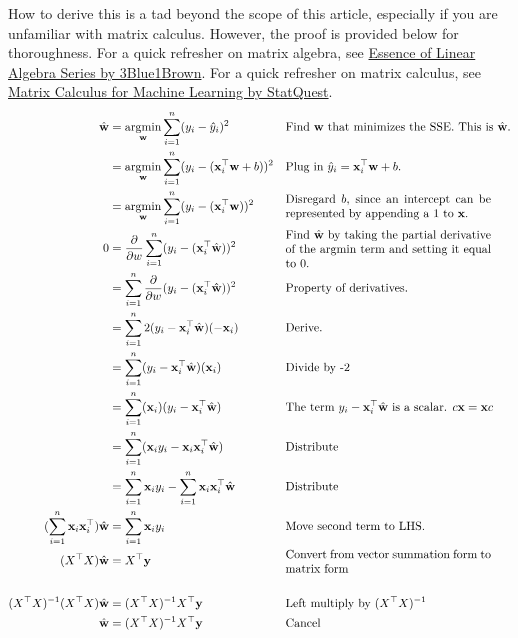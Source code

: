     How to derive this is a tad beyond the scope of this article, especially if you are unfamiliar with matrix calculus. However, the proof is provided below for thoroughness. For a quick refresher on matrix algebra, see \href{https://www.youtube.com/playlist?list=PLZHQObOWTQDNU6R1_67000Dx_ZCJB-3pi}{Essence of Linear Algebra Series by 3Blue1Brown}. For a quick refresher on matrix calculus, see \href{https://www.youtube.com/watch?v=tIkzL4jlt8g}{Matrix Calculus for Machine Learning by StatQuest}.
    \begin{align*}
      \hat{\textbf{w}} &= \argmin_{\mathbf{w}} \sum_{i=1}^n (y_i - \hat{y}_i)^2 && \text{Find $\textbf{w}$ that minimizes the SSE. This is $\hat{\textbf{w}}$.}\\
                       &= \argmin_\mathbf{w} \sum_{i=1}^n (y_i - (\textbf{x}_i^{\top}\textbf{w} + b))^2 && \text{Plug in $\hat{y}_i = \textbf{x}_i^{\top}\textbf{w} + b$.}\\
                       &= \argmin_\mathbf{w} \sum_{i=1}^n (y_i - (\textbf{x}_i^{\top}\textbf{w}))^2 && \text{\parbox{0.5\textwidth}{Disregard $b$, since an intercept can be represented by appending a 1 to $\textbf{x}$.}}\\
        0 &= \frac{\partial}{\partial w} \sum_{i=1}^n (y_i - (\textbf{x}_i^{\top}\hat{\textbf{w}}))^2 && \text{\parbox{0.5\textwidth}{Find $\hat{\textbf{w}}$ by taking the partial derivative of the argmin term and setting it equal to 0.}}\\
          &= \sum_{i=1}^n \frac{\partial}{\partial w} (y_i - (\textbf{x}_i^{\top}\hat{\textbf{w}}))^2 && \text{Property of derivatives.}\\
          &= \sum_{i=1}^n 2(y_i - \textbf{x}_i^{\top}\hat{\textbf{w}})(-\textbf{x}_i) && \text{Derive.}\\
          &= \sum_{i=1}^n (y_i - \textbf{x}_i^{\top}\hat{\textbf{w}})(\textbf{x}_i) && \text{Divide by -2}\\
          &= \sum_{i=1}^n (\textbf{x}_i)(y_i - \textbf{x}_i^{\top}\hat{\textbf{w}}) && \text{The term $y_i - \textbf{x}_i^{\top}\hat{\textbf{w}}$ is a scalar. $c\textbf{x} = \textbf{x}c$}\\
          &= \sum_{i=1}^n (\textbf{x}_iy_i - \textbf{x}_i\textbf{x}_i^{\top}\hat{\textbf{w}}) && \text{Distribute}\\
          &= \sum_{i=1}^n \textbf{x}_iy_i - \sum_{i=1}^n \textbf{x}_i\textbf{x}_i^{\top}\hat{\textbf{w}} && \text{Distribute}\\
        (\sum_{i=1}^n \textbf{x}_i\textbf{x}_i^{\top})\hat{\textbf{w}} &= \sum_{i=1}^n \textbf{x}_iy_i && \text{Move second term to LHS.}\\
        (X^{\top}X)\hat{\textbf{w}} &= X^{\top}\textbf{y} && \text{\parbox{0.5\textwidth}{Convert from vector summation form to matrix form}}\\\\
        (X^{\top}X)^{-1}(X^{\top}X)\hat{\textbf{w}} &= (X^{\top}X)^{-1}X^{\top}\textbf{y} && \text{Left multiply by $(X^{\top}X)^{-1}$}\\
        \hat{\textbf{w}} &= (X^{\top}X)^{-1}X^{\top}\textbf{y} && \text{Cancel}\\
    \end{align*}


